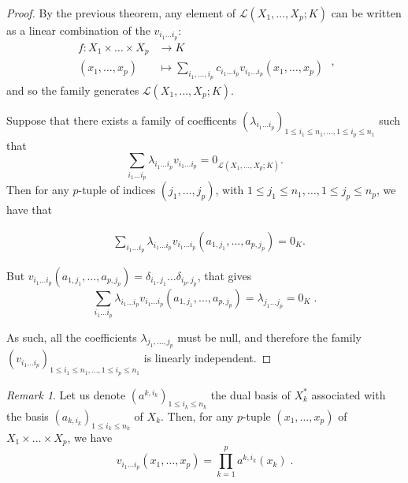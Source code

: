 \documentclass{report}
\theoremstyle{definition}
\theoremstyle{remark}
\newtheorem{remark}{Remark}
\begin{document}
\begin{proof}
        By the previous theorem, any element of $\mathcal{L}(X_1,\dots,X_p;K)$ can be written as a linear combination of the $v_{i_1 \dots i_p}$:
        \begin{equation*}
                \begin{split}
                        f: X_1 \times \dots \times X_p & \to K \\
                        (x_1,\dots,x_p) & \mapsto \sum_{i_1,\dots,i_p} c_{i_1 \dots i_p} v_{i_1 \dots i_p}(x_1,\dots,x_p)
                \end{split}\;,
        \end{equation*} and so the family generates $\mathcal{L}(X_1,\dots,X_p;K)$.


        Suppose that there exists a family of coefficents $(\lambda_{i_1 \dots i_p})_{1\leq i_1 \leq n_1 , \dots, 1\leq i_p \leq n_1}$ such that
        \begin{equation*}
                \sum_{i_1 \dots i_p} \lambda_{i_1 \dots i_p} v_{i_1 \dots i_p} = 0_{\mathcal{L}(X_1,\dots,X_p;K)}.
        \end{equation*}
          Then for any $p$-tuple of indices $(j_1,\dots,j_p)$, with $1 \leq j_1 \leq n_1 , \dots, 1 \leq j_p \leq n_p$, we have that
          
        \begin{equation*}
                \begin{split}
                        & \sum_{i_1 \dots i_p} \lambda_{i_1 \dots i_p} v_{i_1 \dots i_p} (a_{1,j_1},\dots,a_{p,j_p}) = 0_K .
                \end{split}
        \end{equation*}
        
        But $v_{i_1 \dots i_p} (a_{1,j_1},\dots,a_{p,j_p})= \delta_{i_1,j_1} \dots \delta_{i_p,j_p}$, that gives 
        $$\sum_{i_1 \dots i_p} \lambda_{i_1 \dots i_p} v_{i_1 \dots i_p} (a_{1,j_1},\dots,a_{p,j_p})= \lambda_{j_1 \dots j_p}=0_K\;.$$
        
        As such, all the coefficients $\lambda_{j_1,\dots,j_p}$ must be null, and therefore the family $(v_{i_1 \dots i_p})_{1\leq i_1 \leq n_1 , \dots, 1\leq i_p \leq n_1}$ is linearly independent.
\end{proof}

\bigskip
\begin{remark} Let us denote $(a^{k,i_k})_{1 \leq i_k \leq n_k}$ the dual basis of $X_k^*$ associated with the basis $(a_{k,i_k})_{1 \leq i_k \leq n_k}$ of $X_k$.
Then, for any $p$-tuple $(x_1,\dots,x_p)$ of $X_1 \times \dots \times X_p$, we have
$$v_{i_1 \dots i_p}(x_1,\dots,x_p) = \prod_{k=1}^p a^{k,i_k}(x_k)\;.$$ 

\end{remark}
\end{document}

